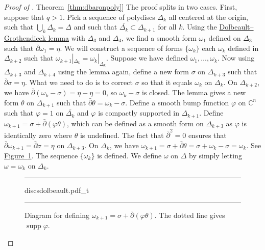 \documentclass[12pt,openany]{book}
\newcommand{\supp}{\operatorname{supp}}
\newcommand{\C}{{\mathbb{C}}}
\theoremstyle{plain}
\theoremstyle{remark}
\theoremstyle{definition}
\newenvironment{myfig}{%
\begin{figure}[h!t]
\noindent\rule{\textwidth}{0.5pt}\vspace{12pt}\par\centering}%
{\par\noindent\rule{\textwidth}{0.5pt}
\end{figure}}
\theoremstyle{exercise}
\theoremstyle{example}
\newcommand{\figureref}[1]{\hyperref[#1]{Figure~\ref*{#1}}}
\newcommand{\thmref}[1]{\hyperref[#1]{Theorem~\ref*{#1}}}
\begin{document}
\begin{proof}[Proof of \thmref{thm:dbaronpoly}]
The proof splits in two cases.  First, suppose that $q > 1$.
Pick a sequence of polydiscs $\Delta_k$ all centered at the origin,
such that $\bigcup_k \Delta_k = \Delta$ and such that $\overline{\Delta_k}
\subset \Delta_{k+1}$ for all $k$.
Using the
\hyperref[lemma:dolgro]{Dolbeault--Grothendieck lemma} with $\Delta_3$ and
$\Delta_4$, we find a smooth form $\omega_1$ defined on
$\Delta_3$ such that $\bar{\partial} \omega_1 = \eta$.
We will construct a sequence of forms $\{ \omega_k \}$
each $\omega_k$ defined in $\Delta_{k+2}$
such that $\omega_{k+1}|_{\Delta_k} = \omega_k|_{\Delta_k}$.
Suppose we have defined $\omega_1,\ldots,\omega_k$.
Now using $\Delta_{k+3}$ and $\Delta_{k+4}$ using the lemma again,
define a new form $\sigma$ on $\Delta_{k+3}$ such that $\bar{\partial}
\sigma = \eta$.  What we need to do is to correct $\sigma$ so that it equals
$\omega_k$ on $\Delta_k$.  On $\Delta_{k+2}$, we have
$\bar{\partial}(\omega_k-\sigma) = \eta-\eta = 0$, so $\omega_k-\sigma$
is closed.  The lemma gives a new form $\theta$ on $\Delta_{k+1}$ such that
$\bar{\partial}\theta = \omega_k-\sigma$.
Define a smooth bump function $\varphi$ on $\C^n$ such that $\varphi=1$ on
$\overline{\Delta_{k}}$ and $\varphi$ is compactly supported in
$\Delta_{k+1}$.  Define
$\omega_{k+1} = \sigma + \bar{\partial}(\varphi \theta)$, which can be
defined as a smooth form on $\Delta_{k+3}$ as $\varphi$ is identically zero
where $\theta$ is undefined.  The fact that
$\bar{\partial}^2=0$ ensures that $\bar{\partial}\omega_{k+1} =
\bar{\partial} \sigma = \eta$ on $\Delta_{k+3}$.  On $\Delta_k$, we have
$\omega_{k+1} = \sigma + \bar{\partial}\theta = \sigma+\omega_k-\sigma=\omega_k$.
See \figureref{fig:discsdolbeault}.
The sequence $\{ \omega_k \}$ is defined.
We define $\omega$ on $\Delta$ by simply letting $\omega =
\omega_k$ on $\Delta_k$.

\begin{myfig}
{discsdolbeault.pdf_t}
\caption{Diagram for defining $\omega_{k+1}=\sigma + \bar{\partial}(\varphi \theta)$.
The dotted line gives $\supp \varphi$.\label{fig:discsdolbeault}}
\end{myfig}


\end{proof}
\end{document}

